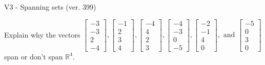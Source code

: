 \begin{exercise}
  \begin{exerciseTitle}V3 - Spanning sets (ver. 399)\end{exerciseTitle}
  \begin{exerciseStatement}
    Explain why the vectors \(\left[\begin{array}{r}
-3 \\
-3 \\
2 \\
-4
\end{array}\right] , \left[\begin{array}{r}
-1 \\
2 \\
3 \\
4
\end{array}\right] , \left[\begin{array}{r}
-4 \\
4 \\
2 \\
3
\end{array}\right] , \left[\begin{array}{r}
-4 \\
-3 \\
0 \\
-5
\end{array}\right] , \left[\begin{array}{r}
-2 \\
-1 \\
4 \\
0
\end{array}\right] , \text{ and } \left[\begin{array}{r}
-5 \\
0 \\
3 \\
0
\end{array}\right]\) span or don't span \(\mathbb{R}^4\). 
	



\end{exerciseStatement}
\end{exercise}
